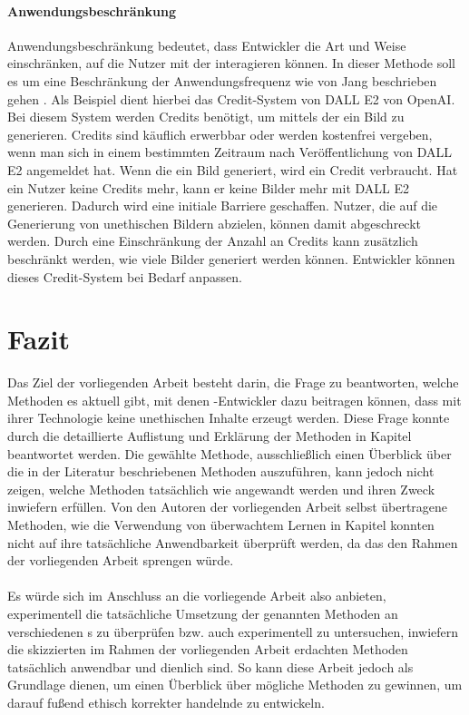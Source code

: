 \documentclass[hidelinks,12pt]{report}
\begin{document}
\subsubsection{Anwendungsbeschränkung} %
Anwendungsbeschränkung bedeutet, dass Entwickler die Art und Weise einschränken, auf die Nutzer mit der  interagieren können. In dieser Methode soll es um eine Beschränkung der Anwendungsfrequenz wie von Jang beschrieben gehen \cite{Jang}. Als Beispiel dient hierbei das Credit-System von DALL E2 von OpenAI. Bei diesem System werden Credits benötigt, um mittels der  ein Bild zu generieren. Credits sind käuflich erwerbbar oder werden kostenfrei vergeben, wenn man sich in einem bestimmten Zeitraum nach Veröffentlichung von DALL E2 angemeldet hat. Wenn die  ein Bild generiert, wird ein Credit verbraucht. Hat ein Nutzer keine Credits mehr, kann er keine Bilder mehr mit DALL E2 generieren. Dadurch wird eine initiale Barriere geschaffen. Nutzer, die auf die Generierung von unethischen Bildern abzielen, können damit abgeschreckt werden. Durch eine Einschränkung der Anzahl an Credits kann zusätzlich beschränkt werden, wie viele Bilder generiert werden können. Entwickler können dieses Credit-System bei Bedarf anpassen.

\newpage
\begingroup
\let\clearpage\relax

\chapter{Fazit}
Das Ziel der vorliegenden Arbeit besteht darin, die Frage zu beantworten, welche Methoden es aktuell gibt, mit denen -Entwickler dazu beitragen können, dass mit ihrer Technologie keine unethischen Inhalte erzeugt werden. Diese Frage konnte durch die detaillierte Auflistung und Erklärung der Methoden in Kapitel  beantwortet werden. Die gewählte Methode, ausschließlich einen Überblick über die in der Literatur beschriebenen Methoden auszuführen, kann jedoch nicht zeigen, welche Methoden tatsächlich wie angewandt werden und ihren Zweck inwiefern erfüllen. Von den Autoren der vorliegenden Arbeit selbst übertragene Methoden, wie die Verwendung von überwachtem Lernen in Kapitel  konnten nicht auf ihre tatsächliche Anwendbarkeit überprüft werden, da das den Rahmen der vorliegenden Arbeit sprengen würde.
\\\\
Es würde sich im Anschluss an die vorliegende Arbeit also anbieten, experimentell die tatsächliche Umsetzung der genannten Methoden an verschiedenen s zu überprüfen bzw. auch experimentell zu untersuchen, inwiefern die skizzierten im Rahmen der vorliegenden Arbeit erdachten Methoden tatsächlich anwendbar und dienlich sind. So kann diese Arbeit jedoch als Grundlage dienen, um einen Überblick über mögliche Methoden zu gewinnen, um darauf fußend ethisch korrekter handelnde  zu entwickeln.
\end{document}
